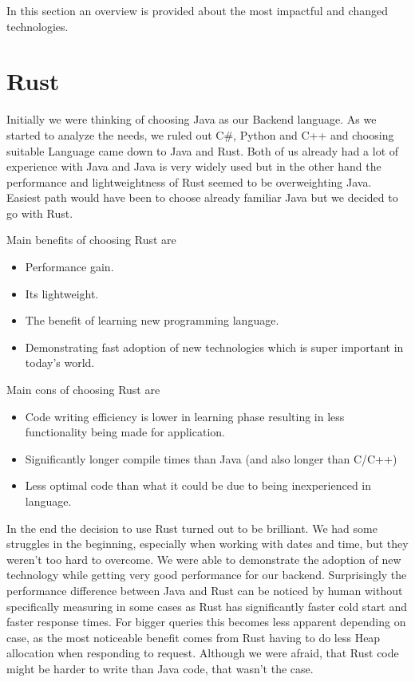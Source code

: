 In this section an overview is provided about the most impactful and changed technologies.

\section{Rust}\label{sec:rust}
Initially we were thinking of choosing Java as our Backend language.
As we started to analyze the needs, we ruled out C\#, Python and C++ and choosing suitable Language came down to Java and Rust.
Both of us already had a lot of experience with Java and Java is very widely used but in the other hand the performance and lightweightness of Rust seemed to be overweighting Java.
Easiest path would have been to choose already familiar Java but we decided to go with Rust.

Main benefits of choosing Rust are
\begin{itemize}
    \item Performance gain.
    \item Its lightweight.
    \item The benefit of learning new programming language.
    \item Demonstrating fast adoption of new technologies which is super important in today's world.
\end{itemize}

Main cons of choosing Rust are
\begin{itemize}
    \item Code writing efficiency is lower in learning phase resulting in less functionality being made for application.
    \item Significantly longer compile times than Java (and also longer than C/C++)
    \item Less optimal code than what it could be due to being inexperienced in language.
\end{itemize}

In the end the decision to use Rust turned out to be brilliant.
We had some struggles in the beginning, especially when working with dates and time, but they weren't too hard to overcome.
We were able to demonstrate the adoption of new technology while getting very good performance for our backend.
Surprisingly the performance difference between Java and Rust can be noticed by human without specifically measuring in some cases
as Rust has significantly faster cold start and faster response times.
For bigger queries this becomes less apparent depending on case, as the most noticeable benefit comes from Rust
having to do less Heap allocation when responding to request.
Although we were afraid, that Rust code might be harder to write than Java code, that wasn't the case.

